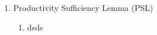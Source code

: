 \documentclass[hidelinks, nonatbib]{elsarticle}
\begin{document}
\begin{enumerate}

    \item Productivity Sufficiency Lemma (PSL)
    \begin{enumerate}
        \item dsds
    \end{enumerate}


\end{enumerate}
\end{document}
